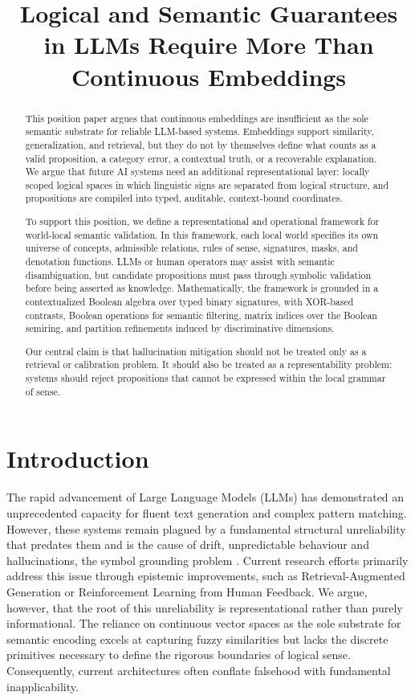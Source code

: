 \documentclass{article}
\title{Logical and Semantic Guarantees in LLMs Require More Than
Continuous Embeddings}
\author{}
\begin{document}
\maketitle

\begin{abstract}
	This position paper argues that continuous embeddings are insufficient
 as the sole semantic substrate for reliable LLM-based systems.
 Embeddings support similarity, generalization, and retrieval, but they
 do not by themselves define what counts as a valid proposition, a
 category error, a contextual truth, or a recoverable explanation. We
 argue that future AI systems need an additional representational layer:
 locally scoped logical spaces in which linguistic signs are separated
 from logical structure, and propositions are compiled into typed,
 auditable, context-bound coordinates.

 To support this position, we define a representational and operational
 framework for world-local semantic validation. In this framework, each
 local world specifies its own universe of concepts, admissible
 relations, rules of sense, signatures, masks, and denotation functions.
 LLMs or human operators may assist with semantic disambiguation, but
 candidate propositions must pass through symbolic validation before
 being asserted as knowledge. Mathematically, the framework is grounded
 in a contextualized Boolean algebra over typed binary signatures, with
 XOR-based contrasts, Boolean operations for semantic filtering, matrix
 indices over the Boolean semiring, and partition refinements induced by
 discriminative dimensions.

 Our central claim is that hallucination mitigation should not be
 treated only as a retrieval or calibration problem. It should also be
 treated as a representability problem: systems should reject
 propositions that cannot be expressed within the local grammar of
 sense.
\end{abstract}

\hypertarget{introduction}{%
\section{Introduction}\label{introduction}}

The rapid advancement of Large Language Models (LLMs) has demonstrated
an unprecedented capacity for fluent text generation and complex pattern
matching. However, these systems remain plagued by a fundamental
structural unreliability that predates them and is the cause of drift,
unpredictable behaviour and hallucinations, the symbol grounding problem
\citep{harnad1990symbolgrounding}. Current research efforts primarily
address this issue through epistemic improvements, such as
Retrieval-Augmented Generation or Reinforcement Learning from Human
Feedback. We argue, however, that the root of this unreliability is
representational rather than purely informational. The reliance on
continuous vector spaces as the sole substrate for semantic encoding
excels at capturing fuzzy similarities but lacks the discrete primitives
necessary to define the rigorous boundaries of logical sense.
Consequently, current architectures often conflate falsehood with
fundamental inapplicability.
\end{document}
